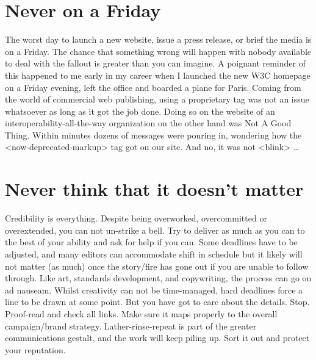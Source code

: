 \section*{Never on a Friday}
The worst day to launch a new website, issue a press release, or brief the media
is on a Friday. The chance that something wrong will happen with nobody
available to deal with the fallout is greater than you can imagine. A poignant
reminder of this happened to me early in my career when I launched the new W3C
homepage on a Friday evening, left the office and boarded a plane for Paris.
Coming from the world of commercial web publishing, using a proprietary tag
was not an issue whatsoever as long as it got the job done. Doing so on the
website of an interoperability-all-the-way organization on the other hand was
Not A Good Thing. Within minutes dozens of messages were pouring in, wondering
how the <now-deprecated-markup> tag got on our site. And no, it was not <blink> \dots

\section*{Never think that it doesn't matter}
Credibility is everything. Despite being overworked, overcommitted or overextended,
you can not un-strike a bell. Try to deliver as much as you can to the best of
your ability and ask for help if you can. Some deadlines have to be adjusted,
and many editors can accommodate shift in schedule but it likely will not matter
(as much) once the story/fire has gone out if you are unable to follow through.
Like art, standards development, and copywriting, the process can go on ad
nauseam. Whilst creativity can not be time-managed, hard deadlines force a line to
be drawn at some point. But you have got to care about the details. Stop.
Proof-read and check all links. Make sure it maps properly to the overall
campaign/brand strategy. Lather-rinse-repeat is part of the greater
communications gestalt, and the work will keep piling up. Sort it out and
protect your reputation.


